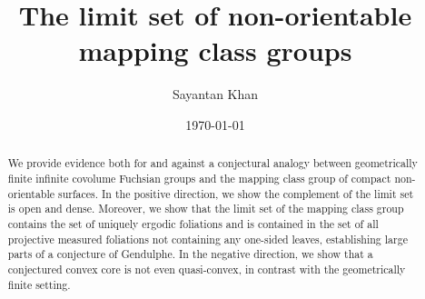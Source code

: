 \documentclass[12pt, reqno]{amsart}
\title{The limit set of non-orientable mapping class groups}
\author{Sayantan Khan}
\date{\today}
\begin{document}
\begin{abstract}
  We provide evidence both for and against a conjectural analogy between geometrically finite infinite covolume Fuchsian groups and the mapping class group of compact non-orientable surfaces.
  In the positive direction, we show the complement of the limit set is open and dense.
  Moreover, we show that the limit set of the mapping class group contains the set of uniquely ergodic foliations and is contained in the set of all projective measured foliations not containing any one-sided leaves, establishing large parts of a conjecture of Gendulphe.
  In the negative direction, we show that a conjectured convex core is not even quasi-convex, in contrast with the geometrically finite setting.
\end{abstract}
\maketitle








\printbibliography
\end{document}
